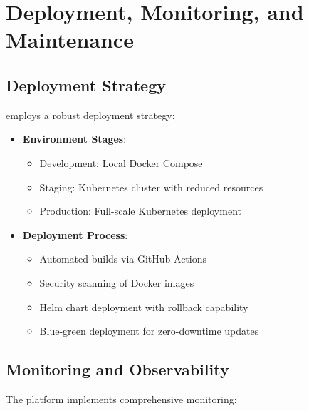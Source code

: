 \section{Deployment, Monitoring, and Maintenance}

\subsection{Deployment Strategy}

\sysname{} employs a robust deployment strategy:

\begin{itemize}
    \item \textbf{Environment Stages}:
    \begin{itemize}
        \item Development: Local Docker Compose
        \item Staging: Kubernetes cluster with reduced resources
        \item Production: Full-scale Kubernetes deployment
    \end{itemize}

    \item \textbf{Deployment Process}:
    \begin{itemize}
        \item Automated builds via GitHub Actions
        \item Security scanning of Docker images
        \item Helm chart deployment with rollback capability
        \item Blue-green deployment for zero-downtime updates
    \end{itemize}
\end{itemize}

\subsection{Monitoring and Observability}

The platform implements comprehensive monitoring:

